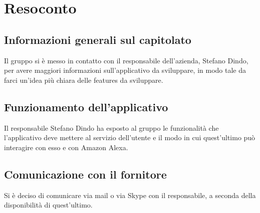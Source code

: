 \section{Resoconto}
\subsection{Informazioni generali sul capitolato}
Il gruppo si è messo in contatto con il responsabile dell'azienda, Stefano Dindo, per avere maggiori informazioni sull'applicativo da sviluppare, in modo tale da farci un'idea più chiara delle features da sviluppare.
\subsection{Funzionamento dell'applicativo}
Il responsabile Stefano Dindo ha esposto al gruppo le funzionalità che l'applicativo deve mettere al servizio dell'utente e il modo in cui quest'ultimo può interagire con esso e con Amazon Alexa.
\subsection{Comunicazione con il fornitore}
Si è deciso di comunicare via mail o via Skype con il responsabile, a seconda della disponibilità di quest'ultimo.